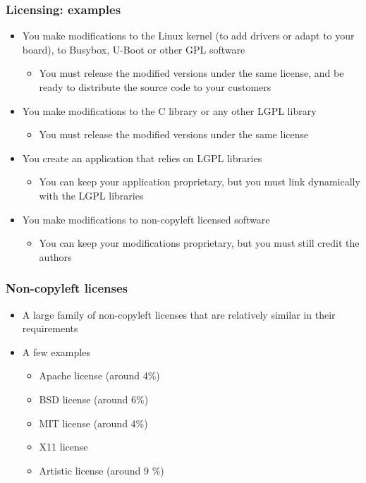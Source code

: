 \begin{frame}
  \frametitle{Licensing: examples}
  \begin{itemize}
  \item You make modifications to the Linux kernel (to add drivers or
    adapt to your board), to Busybox, U-Boot or other GPL software
    \begin{itemize}
    \item You must release the modified versions under the same
      license, and be ready to distribute the source code to your
      customers
    \end{itemize}
  \item You make modifications to the C library or any other LGPL
    library
    \begin{itemize}
    \item You must release the modified versions under the same
      license
    \end{itemize}
  \item You create an application that relies on LGPL libraries
    \begin{itemize}
    \item You can keep your application proprietary, but you must link
      dynamically with the LGPL libraries
    \end{itemize}
  \item You make modifications to non-copyleft licensed software
    \begin{itemize}
    \item You can keep your modifications proprietary, but you must
      still credit the authors
    \end{itemize}
  \end{itemize}
\end{frame}

\begin{frame}
  \frametitle{Non-copyleft licenses}
  \begin{itemize}
  \item A large family of non-copyleft licenses that are relatively
    similar in their requirements
  \item A few examples
    \begin{itemize}
    \item Apache license (around 4\%)
    \item BSD license (around 6\%)
    \item MIT license (around 4\%)
    \item X11 license
    \item Artistic license (around 9 \%)
    \end{itemize}
  \end{itemize}
\end{frame}

